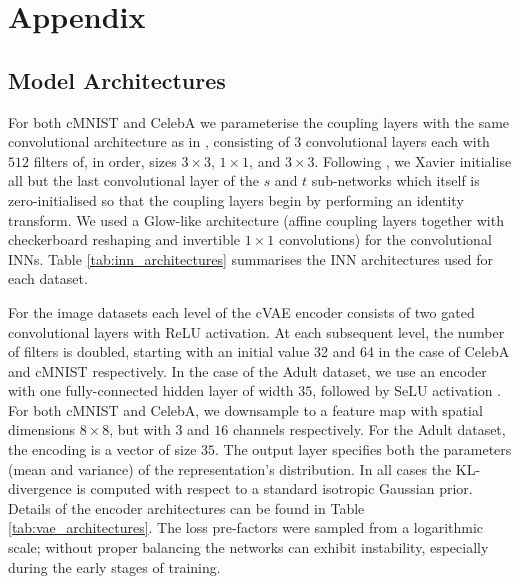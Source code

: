 
\section{Appendix}


\subsection{Model Architectures}%
\label{sec:architectures}
\noindent For both cMNIST and CelebA we parameterise the coupling layers with the same convolutional architecture as in \cite{KinDha18}, consisting of $3$ convolutional layers each with $512$ filters of, in order, sizes $3\times3$, $1\times1$, and $3\times3$.
Following \cite{ardizzone2019guided}, we Xavier initialise all but the last convolutional layer of the $s$ and $t$ sub-networks which itself is zero-initialised so that the coupling layers begin by performing an identity transform. We used a Glow-like architecture \cite{KinDha18} (affine coupling layers together with checkerboard reshaping and invertible $1\times1$ convolutions) for the convolutional INNs. Table \ref{tab:inn_architectures} summarises the INN architectures used for each dataset.

For the image datasets each level of the cVAE encoder consists of two gated convolutional layers \cite{van2016conditional} with ReLU activation. 
At each subsequent level, the number of filters is doubled, starting with an initial value 32 and 64 in the case of CelebA and cMNIST respectively. 
In the case of the Adult dataset, we use an encoder with one fully-connected hidden layer of width $35$, followed by SeLU activation \cite{klambauer2017self}. 
For both cMNIST and CelebA, we downsample to a feature map with spatial dimensions $8\times8$, but with $3$ and $16$ channels respectively. 
For the Adult dataset, the encoding is a vector of size $35$. 
The output layer specifies both the parameters (mean and variance) of the representation's distribution. 
In all cases the KL-divergence is computed with respect to a standard isotropic Gaussian prior. 
Details of the encoder architectures can be found in Table \ref{tab:vae_architectures}. The loss pre-factors were sampled from a logarithmic scale; without proper balancing the networks can exhibit instability, especially during the early stages of training.

